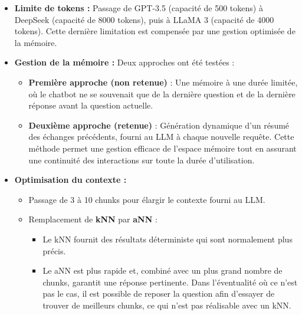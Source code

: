 \documentclass{article}
\begin{document}
\begin{itemize}
    \item \textbf{Limite de tokens :}  
    Passage de GPT-3.5 (capacité de 500 tokens) à DeepSeek (capacité de 8000 tokens), puis à LLaMA 3 (capacité de 4000 tokens). Cette dernière limitation est compensée par une gestion optimisée de la mémoire.

    \item \textbf{Gestion de la mémoire :}  
    Deux approches ont été testées :
    \begin{itemize}
        \item \textbf{Première approche (non retenue)} : Une mémoire à une durée limitée, où le chatbot ne se souvenait que de la dernière question et de la dernière réponse avant la question actuelle.
        \item \textbf{Deuxième approche (retenue)} : Génération dynamique d’un résumé des échanges précédents, fourni au LLM à chaque nouvelle requête. Cette méthode permet une gestion efficace de l’espace mémoire tout en assurant une continuité des interactions sur toute la durée d'utilisation.
    \end{itemize}

    \item \textbf{Optimisation du contexte :}  
    \begin{itemize}
        \item Passage de 3 à 10 chunks pour élargir le contexte fourni au LLM.
        \item Remplacement de \textbf{kNN} par \textbf{aNN} :
        \begin{itemize}
            \item Le kNN fournit des résultats déterministe qui sont normalement plus précis.
            \item Le aNN est plus rapide et, combiné avec un plus grand nombre de chunks, garantit une réponse pertinente. Dans l'éventualité où ce n'est pas le cas, il est possible de reposer la question afin d'essayer de trouver de meilleurs chunks, ce qui n'est pas réalisable avec un kNN.
        \end{itemize}
    \end{itemize}
\end{itemize}
\end{document}
